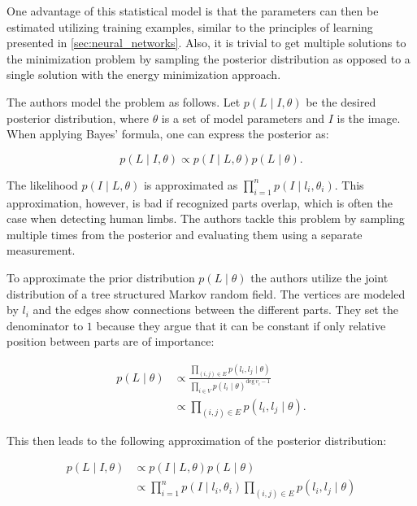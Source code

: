 One advantage of this statistical model is that the parameters can then be estimated utilizing training examples, similar to the principles of learning presented in \ref{sec:neural_networks}.
Also, it is trivial to get multiple solutions to the minimization problem by sampling the posterior distribution as opposed to a single solution with the energy minimization approach.

The authors model the problem as follows.
Let $p(L \mid I, \theta)$ be the desired posterior distribution, where $\theta$ is a set of model parameters and $I$ is the image.
When applying Bayes' formula, one can express the posterior as:

\begin{equation}
    p(L \mid I, \theta) \propto p(I \mid L, \theta) p(L \mid \theta).
\end{equation}

The likelihood $p(I \mid L, \theta)$ is approximated as $\prod_{i=1}^n p(I \mid l_i, \theta_i)$.
This approximation, however, is bad if recognized parts overlap, which is often the case when detecting human limbs.
The authors tackle this problem by sampling multiple times from the posterior and evaluating them using a separate measurement.

To approximate the prior distribution $p(L \mid \theta)$ the authors utilize the joint distribution of a tree structured Markov random field.
The vertices are modeled by $l_i$ and the edges show connections between the different parts. 
They set the denominator to $1$ because they argue that it can be constant if only relative position between parts are of importance:

\begin{equation}
    \begin{split}
        p(L \mid \theta) 
        &\propto \frac{\prod_{(i,j) \in E} p(l_i, l_j \mid \theta)}{\prod_{i \in V} p(l_i \mid \theta)^{\text{deg} ~ v_i -1}} \\
        &\propto \prod_{(i, j) \in E} p(l_i, l_j \mid \theta).
    \end{split}
\end{equation}

This then leads to the following approximation of the posterior distribution:

\begin{equation}
    \label{eq:pictoral-posterior-general}
    \begin{split}
        p(L \mid I, \theta) 
        &\propto p(I \mid L, \theta) p(L \mid \theta) \\
        &\propto \prod_{i=1}^n p(I \mid l_i, \theta_i) \prod_{(i, j) \in E} p(l_i, l_j \mid \theta)
    \end{split} 
\end{equation}

